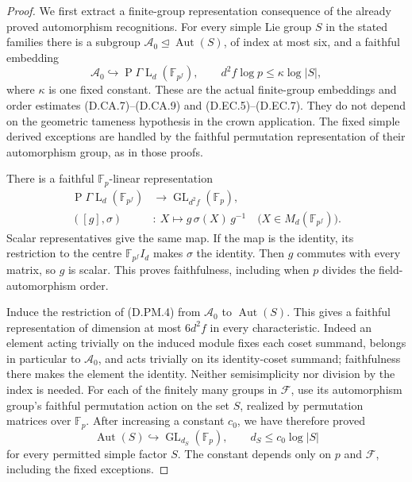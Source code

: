 \begin{proof}
We first extract a finite-group representation consequence of
the already proved automorphism recognitions. For every simple
Lie group $S$ in the stated families there is a subgroup
$\mathcal A_0\trianglelefteq\operatorname{Aut}(S)$, of index at
most six, and a faithful embedding
\[
       \mathcal A_0\hookrightarrow
          \operatorname{P}\Gamma\operatorname L_d
                        (\mathbb F_{p^f}),
       \qquad d^2 f\log p\le \kappa\log|S|,              \tag{D.PM.3}
\]
where $\kappa$ is one fixed constant. These are the actual
finite-group embeddings and order estimates (D.CA.7)--(D.CA.9)
and (D.EC.5)--(D.EC.7). They do not depend on the geometric
tameness hypothesis in the crown application. The fixed simple
derived exceptions are handled by the faithful permutation
representation of their automorphism group, as in those proofs.

There is a faithful $\mathbb F_p$-linear representation
\[
 \begin{split}
 \operatorname{P}\Gamma\operatorname L_d(\mathbb F_{p^f})
       &\longrightarrow
          \operatorname{GL}_{d^2f}(\mathbb F_p),\\
 ([g],\sigma)&:\ X\longmapsto g\,\sigma(X)\,g^{-1}
                    \quad\bigl(X\in M_d(\mathbb F_{p^f})\bigr).
 \end{split}                                             \tag{D.PM.4}
\]
Scalar representatives give the same map. If the map is the
identity, its restriction to the centre
$\mathbb F_{p^f}I_d$ makes $\sigma$ the identity. Then $g$
commutes with every matrix, so $g$ is scalar. This proves
faithfulness, including when $p$ divides the field-automorphism
order.

Induce the restriction of (D.PM.4) from $\mathcal A_0$ to
$\operatorname{Aut}(S)$. This gives a faithful representation
of dimension at most $6d^2f$ in every characteristic.
Indeed an element acting trivially on the induced module
fixes each coset summand, belongs in particular to
$\mathcal A_0$, and acts trivially on its identity-coset
summand; faithfulness there makes the element the identity.
Neither semisimplicity nor division by the index is needed.
For each of the finitely many groups in $\mathcal F$,
use its automorphism group's faithful permutation action on
the set $S$, realized by permutation matrices over
$\mathbb F_p$. After increasing a constant $c_0$, we have
therefore proved
\[
 \operatorname{Aut}(S)\hookrightarrow
             \operatorname{GL}_{d_S}(\mathbb F_p),
       \qquad d_S\le c_0\log|S|                           \tag{D.PM.5}
\]
for every permitted simple factor $S$. The constant depends
only on $p$ and $\mathcal F$, including the fixed exceptions.


\end{proof}
